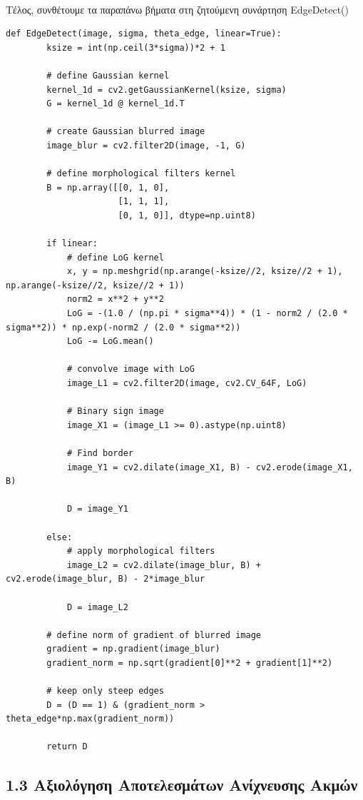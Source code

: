 \documentclass[]{article}
\begin{document}
	\paragraph{} Τέλος, συνθέτουμε τα παραπάνω βήματα στη ζητούμενη συνάρτηση EdgeDetect()
	\begin{lstlisting}[caption={Implementation of EdgeDetect() function}]
	def EdgeDetect(image, sigma, theta_edge, linear=True):
	    ksize = int(np.ceil(3*sigma))*2 + 1 
	    
	    # define Gaussian kernel
	    kernel_1d = cv2.getGaussianKernel(ksize, sigma)
	    G = kernel_1d @ kernel_1d.T
	
	    # create Gaussian blurred image
	    image_blur = cv2.filter2D(image, -1, G)
	
	    # define morphological filters kernel
	    B = np.array([[0, 1, 0],
	                  [1, 1, 1],
	                  [0, 1, 0]], dtype=np.uint8)
	
	    if linear:
	        # define LoG kernel
	        x, y = np.meshgrid(np.arange(-ksize//2, ksize//2 + 1), np.arange(-ksize//2, ksize//2 + 1))
	        norm2 = x**2 + y**2
	        LoG = -(1.0 / (np.pi * sigma**4)) * (1 - norm2 / (2.0 * sigma**2)) * np.exp(-norm2 / (2.0 * sigma**2))
	        LoG -= LoG.mean()
	
	        # convolve image with LoG
	        image_L1 = cv2.filter2D(image, cv2.CV_64F, LoG)
	
	        # Binary sign image
	        image_X1 = (image_L1 >= 0).astype(np.uint8)
	
	        # Find border
	        image_Y1 = cv2.dilate(image_X1, B) - cv2.erode(image_X1, B)
	   
	        D = image_Y1
	
	    else:
	        # apply morphological filters
	        image_L2 = cv2.dilate(image_blur, B) + cv2.erode(image_blur, B) - 2*image_blur
	
	        D = image_L2
	
	    # define norm of gradient of blurred image
	    gradient = np.gradient(image_blur)
	    gradient_norm = np.sqrt(gradient[0]**2 + gradient[1]**2)
	
	    # keep only steep edges
	    D = (D == 1) & (gradient_norm > theta_edge*np.max(gradient_norm))
	
	    return D
	\end{lstlisting}
	\subsection*{1.3 Αξιολόγηση Αποτελεσμάτων Ανίχνευσης Ακμών}	
\end{document}

